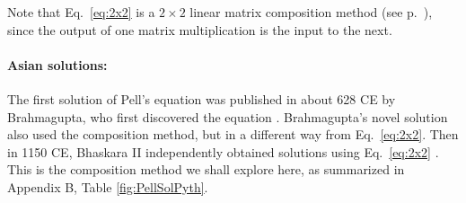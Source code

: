\documentclass{ximera}
\begin{document}
Note that Eq.~\ref{eq:2x2} is a $2\times 2$ linear matrix composition method (see p.~\pageref{composition}),
since the output of one matrix multiplication is the input to the next.

\paragraph{Asian solutions:} 
The first solution of Pell's equation was published in about 628 CE by Brahmagupta, who first discovered
the equation \citep[p.~46]{JS10}.  Brahmagupta's novel solution also used the composition method, but
in a different way from Eq.~\ref{eq:2x2}.
Then in 1150 CE, Bhaskara II independently obtained solutions using Eq.~\ref{eq:2x2} \citep[p.69]{JS10}. 
This is the composition method we shall explore here, as summarized in Appendix B, Table \ref{fig:PellSolPyth}.
\end{document}

